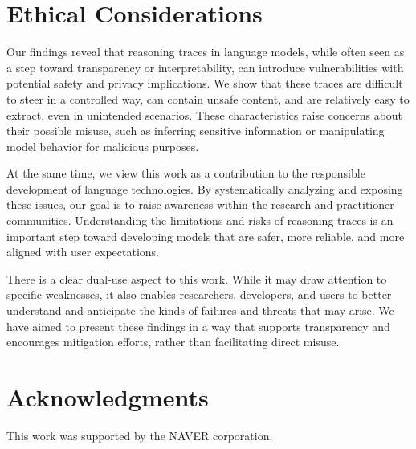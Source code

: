 \section*{Ethical Considerations}

Our findings reveal that reasoning traces in language models, while often seen as a step toward transparency or interpretability, can introduce vulnerabilities with potential safety and privacy implications. We show that these traces are difficult to steer in a controlled way, can contain unsafe content, and are relatively easy to extract, even in unintended scenarios. These characteristics raise concerns about their possible misuse, such as inferring sensitive information or manipulating model behavior for malicious purposes.

At the same time, we view this work as a contribution to the responsible development of language technologies. By systematically analyzing and exposing these issues, our goal is to raise awareness within the research and practitioner communities. Understanding the limitations and risks of reasoning traces is an important step toward developing models that are safer, more reliable, and more aligned with user expectations.

There is a clear dual-use aspect to this work. While it may draw attention to specific weaknesses, it also enables researchers, developers, and users to better understand and anticipate the kinds of failures and threats that may arise. We have aimed to present these findings in a way that supports transparency and encourages mitigation efforts, rather than facilitating direct misuse.

\section*{Acknowledgments}
This work was supported by the NAVER corporation.
